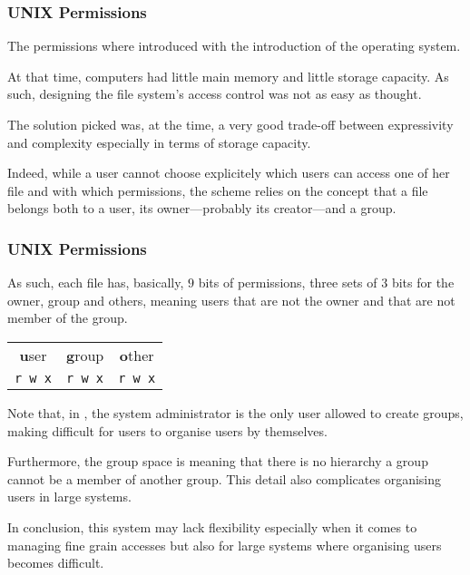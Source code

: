 \begin{frame}
  \frametitle{UNIX Permissions}

  The  permissions where introduced with the introduction of
  the  operating system.

  \-

  At that time, computers had little main memory and little storage capacity.
  As such, designing the file system's access control was not as easy as
  thought.

  \-

  The solution picked was, at the time, a very good trade-off between
  expressivity and complexity especially in terms of storage capacity.

  \-

  Indeed, while a user cannot choose explicitely which users can access one of
  her file and with which permissions, the  scheme relies on the
  concept that a file belongs both to a user, its owner---probably its
  creator---and a group.
\end{frame}


\begin{frame}[containsverbatim]
  \frametitle{UNIX Permissions}

  As such, each file has, basically, $9$ bits of permissions, three sets of
  $3$ bits  for the owner, group and others, meaning users that are
  not the owner and that are not member of the group.

  \-

  \begin{center}
    \begin{tabular}{ccc}
      \textbf{u}ser & \textbf{g}roup & \textbf{o}ther \\
      \verb|r w x| & \verb|r w x| & \verb|r w x| \\
    \end{tabular}
  \end{center}

  \-

  Note that, in , the system administrator is the only user allowed
  to create groups, making difficult for users to organise users by themselves.

  \-

  Furthermore, the group space is  meaning that there is no
  hierarchy \ie{} a group cannot be a member of another group. This detail
  also complicates organising users in large systems.

  \-

  In conclusion, this system may lack flexibility especially when it comes to
  managing fine grain accesses but also for large systems where organising
  users becomes difficult.
\end{frame}

